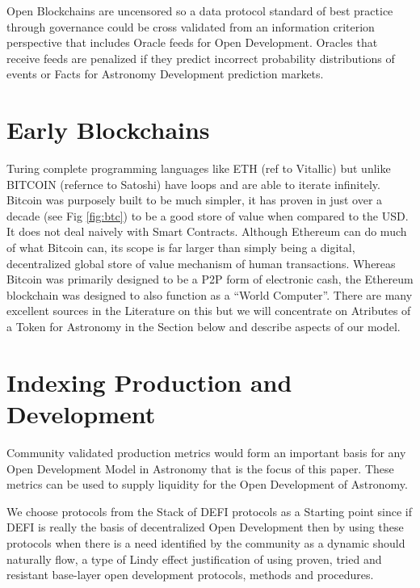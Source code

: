 \documentclass[final,5p,times,twocolumn,authoryear]{elsarticle}
\begin{document}
Open Blockchains are uncensored so a data protocol standard of best practice through governance could be cross validated from an information criterion perspective that includes Oracle feeds for Open Development.  Oracles that receive feeds are penalized if they predict incorrect probability distributions of events or Facts for Astronomy Development prediction markets. 

\section{Early Blockchains}
Turing complete programming languages like ETH (ref to Vitallic) but unlike BITCOIN  (refernce to Satoshi) have loops and are able to iterate infinitely.  Bitcoin was purposely built to be much simpler, it has proven in just over a decade (see Fig \ref{fig:btc}) to be a good store of value when compared to the USD. It does not deal naively with Smart Contracts. Although Ethereum can do much of what Bitcoin can, its scope is far larger than simply being a digital, decentralized global store of value mechanism of human transactions. Whereas Bitcoin was primarily designed to be a P2P form of electronic cash, the Ethereum blockchain was designed to also function as a “World Computer”. There are many excellent sources in the Literature on this but we will concentrate on Atributes of a Token for Astronomy in the Section below and describe aspects of our model.
 

\section{Indexing Production and Development}

Community validated production metrics would form an important basis for any Open Development Model in Astronomy that is the focus of this paper. These metrics can be used to supply liquidity for the Open Development of Astronomy.  

We choose protocols from the Stack of DEFI protocols as a Starting point since if DEFI is really the basis of decentralized Open Development then by using these protocols when there is a need identified by the community as a dynamic should naturally flow, a type of Lindy effect justification of using proven, tried and resistant base-layer open development protocols, methods and procedures.
 
\end{document}
